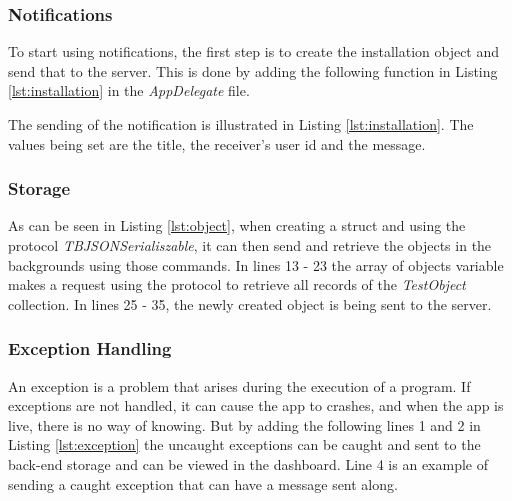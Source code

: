 

\subsubsection{Notifications}
To start using notifications, the first step is to create the installation object and send that to the server. This is done by adding the following function in Listing \ref{lst:installation} in the \textit{AppDelegate} file.



The sending of the notification is illustrated in Listing \ref{lst:installation}. The values being set are the title, the receiver's user id and the message.



\subsubsection{Storage}



As can be seen in Listing \ref{lst:object}, when creating a struct and using the protocol \textit{TBJSONSerialiszable}, it can then send and retrieve the objects in the backgrounds using those commands. In lines 13 - 23 the array of objects variable makes a request using the protocol to retrieve all records of the \textit{TestObject} collection. In lines 25 - 35, the newly created object is being sent to the server.


\subsubsection{Exception Handling}

An exception is a problem that arises during the execution of a program. If exceptions are not handled, it can cause the app to crashes, and when the app is live, there is no way of knowing. But by adding the following lines 1 and 2 in Listing \ref{lst:exception} the uncaught exceptions can be caught and sent to the back-end storage and can be viewed in the dashboard. Line 4 is an example of sending a caught exception that can have a message sent along.

